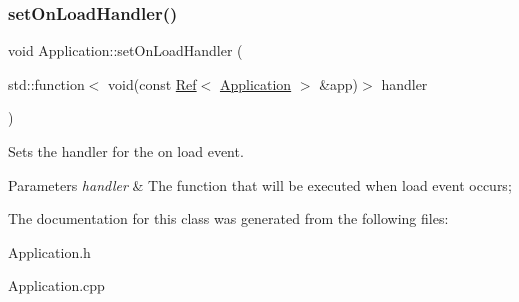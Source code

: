 \subsubsection{\texorpdfstring{setOnLoadHandler()}{setOnLoadHandler()}}
{\footnotesize\ttfamily void Application\+::set\+On\+Load\+Handler (\begin{DoxyParamCaption}\item[{std\+::function$<$ void(const \mbox{\hyperlink{class_ref}{Ref}}$<$ \mbox{\hyperlink{class_application}{Application}} $>$ \&app)$>$}]{handler }\end{DoxyParamCaption})}



Sets the handler for the on load event. 


\begin{DoxyParams}{Parameters}
{\em handler} & The function that will be executed when load event occurs; \\
\hline
\end{DoxyParams}


The documentation for this class was generated from the following files\+:\begin{DoxyCompactItemize}
\item 
Application.\+h\item 
Application.\+cpp\end{DoxyCompactItemize}
